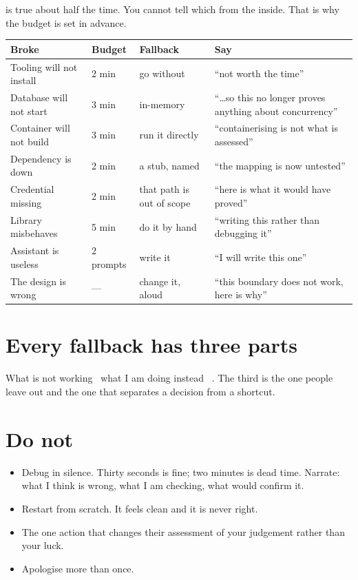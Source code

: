 


 is true about half the time. You cannot tell which
from the inside. That is why the budget is set in advance.

\vspace{3pt}
\small
\begin{tabularx}{\linewidth}{@{}llXX@{}}
\toprule
\textbf{Broke} & \textbf{Budget} & \textbf{Fallback} & \textbf{Say} \\
\midrule
Tooling will not install & 2 min & go without & ``not worth the time'' \\
Database will not start & 3 min & in-memory & ``\ldots so this no longer proves anything about concurrency'' \\
Container will not build & 3 min & run it directly & ``containerising is not what is assessed'' \\
Dependency is down & 2 min & a stub, named & ``the mapping is now untested'' \\
Credential missing & 2 min & that path is out of scope & ``here is what it would have proved'' \\
Library misbehaves & 5 min & do it by hand & ``writing this rather than debugging it'' \\
Assistant is useless & 2 prompts & write it & ``I will write this one'' \\
The design is wrong & --- & change it, aloud & ``this boundary does not work, here is why'' \\
\bottomrule
\end{tabularx}
\normalsize

\section{Every fallback has three parts}
What is not working \dash\ what I am doing instead \dash\ . The third is the one people leave out and the one that separates a
decision from a shortcut.

\section{Do not}
\begin{itemize}
  \item Debug in silence. Thirty seconds is fine; two minutes is dead time.
        Narrate: what I think is wrong, what I am checking, what would confirm it.
  \item Restart from scratch. It feels clean and it is never right.
  \item {} The one action that changes their assessment
        of your judgement rather than your luck.
  \item Apologise more than once.
\end{itemize}

